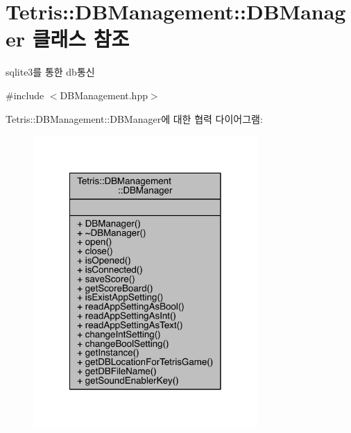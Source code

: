 \hypertarget{class_tetris_1_1_d_b_management_1_1_d_b_manager}{}\section{Tetris\+:\+:D\+B\+Management\+:\+:D\+B\+Manager 클래스 참조}
\label{class_tetris_1_1_d_b_management_1_1_d_b_manager}


sqlite3를 통한 db통신  




{\ttfamily \#include $<$D\+B\+Management.\+hpp$>$}



Tetris\+:\+:D\+B\+Management\+:\+:D\+B\+Manager에 대한 협력 다이어그램\+:
\nopagebreak
\begin{figure}[H]
\begin{center}
\leavevmode
\includegraphics[width=242pt]{class_tetris_1_1_d_b_management_1_1_d_b_manager__coll__graph}
\end{center}
\end{figure}

